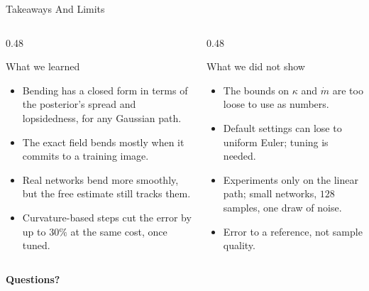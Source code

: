 \documentclass[aspectratio=169]{beamer}
\begin{document}
	\begin{frame}{Takeaways And Limits}
		\begin{columns}[onlytextwidth, T]
			\begin{column}{0.48\textwidth}
				\begin{block}{What we learned}
					\footnotesize
					\begin{minipage}[t][4.0cm][t]{\linewidth}
						\begin{itemize}
							\item Bending has a closed form in terms of the posterior's spread and lopsidedness, for any Gaussian path.
							\item The exact field bends mostly when it commits to a training image.
							\item Real networks bend more smoothly, but the free estimate still tracks them.
							\item Curvature-based steps cut the error by up to $30\%$ at the same cost, once tuned.
						\end{itemize}
					\end{minipage}
				\end{block}
			\end{column}
			\begin{column}{0.48\textwidth}
				\begin{block}{What we did not show}
					\footnotesize
					\begin{minipage}[t][4.0cm][t]{\linewidth}
						\begin{itemize}
							\item The bounds on $\kappa$ and $\dot m$ are too loose to use as numbers.
							\item Default settings can lose to uniform Euler; tuning is needed.
							\item Experiments only on the linear path; small networks, $128$ samples, one draw of noise.
							\item Error to a reference, not sample quality.
						\end{itemize}
					\end{minipage}
				\end{block}
			\end{column}
		\end{columns}
	\end{frame}

	\begin{frame}[plain]
		\centering
		\vfill
		{\fontsize{40}{48}\selectfont\textcolor{coolpurple}{\textbf{Questions?}}}
		\vfill
	\end{frame}
\end{document}
